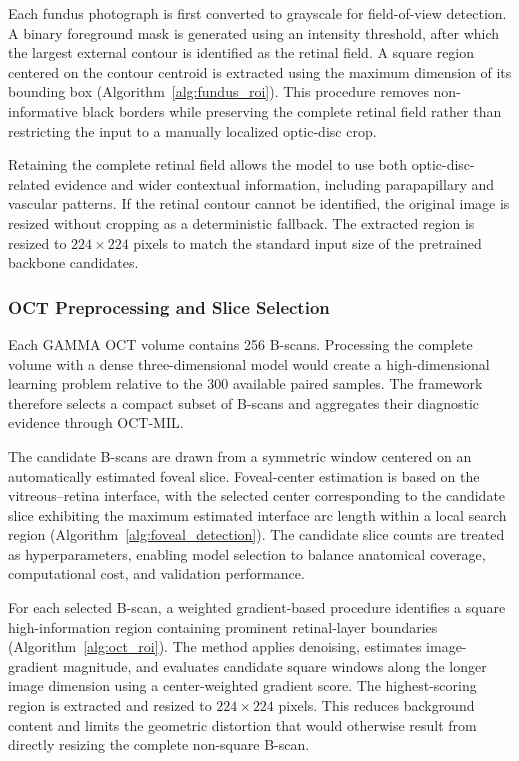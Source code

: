 \documentclass[sn-mathphys]{sn-jnl}%
\theoremstyle{thmstyleone}%
\theoremstyle{thmstyletwo}%
\theoremstyle{thmstylethree}%
\begin{document}
Each fundus photograph is first converted to grayscale for field-of-view detection. A binary foreground mask is generated using an intensity threshold, after which the largest external contour is identified as the retinal field. A square region centered on the contour centroid is extracted using the maximum dimension of its bounding box (Algorithm~\ref{alg:fundus_roi}). This procedure removes non-informative black borders while preserving the complete retinal field rather than restricting the input to a manually localized optic-disc crop.

Retaining the complete retinal field allows the model to use both optic-disc-related evidence and wider contextual information, including parapapillary and vascular patterns. If the retinal contour cannot be identified, the original image is resized without cropping as a deterministic fallback. The extracted region is resized to $224\times224$ pixels to match the standard input size of the pretrained backbone candidates.

\subsubsection{OCT Preprocessing and Slice Selection}
\label{subsubsec:oct_preprocessing}

Each GAMMA OCT volume contains 256 B-scans. Processing the complete volume with a dense three-dimensional model would create a high-dimensional learning problem relative to the 300 available paired samples. The framework therefore selects a compact subset of B-scans and aggregates their diagnostic evidence through OCT-MIL.

The candidate B-scans are drawn from a symmetric window centered on an automatically estimated foveal slice. Foveal-center estimation is based on the vitreous--retina interface, with the selected center corresponding to the candidate slice exhibiting the maximum estimated interface arc length within a local search region (Algorithm~\ref{alg:foveal_detection}). The candidate slice counts are treated as hyperparameters, enabling model selection to balance anatomical coverage, computational cost, and validation performance.

For each selected B-scan, a weighted gradient-based procedure identifies a square high-information region containing prominent retinal-layer boundaries (Algorithm~\ref{alg:oct_roi}). The method applies denoising, estimates image-gradient magnitude, and evaluates candidate square windows along the longer image dimension using a center-weighted gradient score. The highest-scoring region is extracted and resized to $224\times224$ pixels. This reduces background content and limits the geometric distortion that would otherwise result from directly resizing the complete non-square B-scan.
\end{document}
